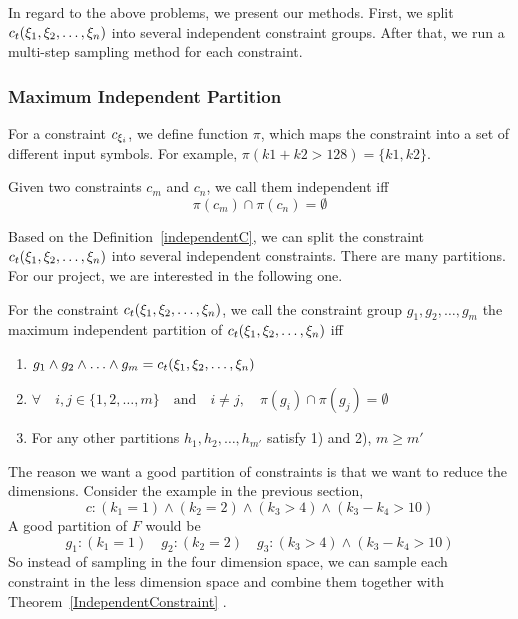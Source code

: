 In regard to the above problems, we present our methods. First, we split
$c_t({\xi}_{1},{\xi}_{2},\ldots,{\xi}_{n})$ into several independent constraint
groups. After that, we run a multi-step sampling method for each constraint.

\subsubsection{Maximum Independent Partition}

For a constraint $c_{{\xi}_{i}}$, we define function $\pi$, which maps the
constraint into a set of different input symbols. For example, $\pi(k1 + k2 >
128) = \{k1, k2\}$.

\begin{mydef}[]
      \label{independentC}
      Given two constraints $c_m$ and $c_n$, we call them independent iff
      $$\pi(c_m) \cap \pi(c_n) = \emptyset$$
\end{mydef}

Based on the Definition~\ref{independentC}, we can split the constraint
$c_t({\xi}_{1},{\xi}_{2},\ldots,{\xi}_{n})$ into several independent constraints.
There are many partitions. For our project, we are interested in the following
one.

\begin{mydef}\label{Goodpartition}
      For the constraint $c_t({\xi}_{1},{\xi}_{2},\ldots,{\xi}_{n})$,
      we call the constraint group
      $g_{1}, g_{2}, \ldots, g_{m}$
      the maximum independent partition of $c_t({\xi}_{1},{\xi}_{2},\ldots,{\xi}_{n})$ iff
      \begin{enumerate}
            \item $g_{1} \land g_{2} \land \ldots \land g_{m} = c_t({\xi}_{1},{\xi}_{2},\ldots,{\xi}_{n})$
            \item $\forall\quad i, j \in \{1, 2, \ldots, m\} \quad \textrm{and} \quad
                        i \neq j, \quad\pi(g_{i}) \cap \pi(g_{j}) = \emptyset $
            \item For any other partitions  $h_{1}, h_{2}, \ldots, h_{m'}$ satisfy 1) and
                  2), $m \geq m'$
      \end{enumerate}

\end{mydef}

The reason we want a good partition of constraints is that we want to reduce
the dimensions. Consider the example in the previous section,
$$c: ({k_1} = 1)\land({k_2} = 2)\land({k_3} > 4)\land({k_3} - {k_4} > 10)$$ A
good partition of $F$ would be
$$g_{1}: ({k_1} = 1)\quad g_{2}: ({k_2} = 2)\quad g_{3}: ({k_3} > 4) \land
({k_3} - {k_4} > 10)$$ So instead of sampling in the four dimension space, we
can sample each constraint in the less dimension space and combine them together
with Theorem~\ref{IndependentConstraint} .

